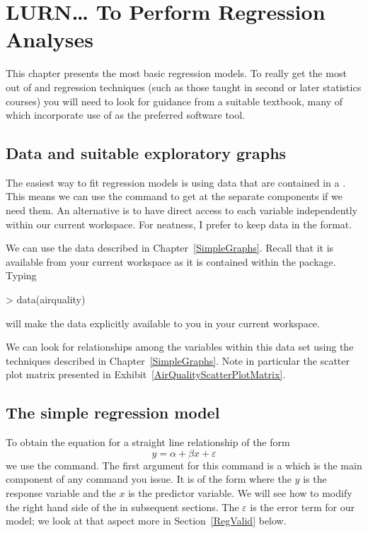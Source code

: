 

\chapter{LURN\ldots{} To Perform Regression Analyses} 
\label{Regression} 
 
 

 
This chapter presents the most basic regression models. To really get the most out of \R{} and regression techniques (such as those taught in second or later statistics courses) you will need to look for guidance from a suitable textbook, many of which incorporate use of \R{} as the preferred software tool. 
 
\section{Data and suitable exploratory graphs} 
 
The easiest way to fit regression models is using data that are contained in a . This means we can use the  command to get at the separate components if we need them. An alternative is to have direct access to each variable independently within our current workspace. For neatness, I prefer to keep data in the  format. 
 
We can use the  data described in Chapter~\ref{SimpleGraphs}. Recall that it is available from your current workspace as it is contained within the  package. Typing 
\begin{Schunk}
\begin{Sinput}
> data(airquality) 
\end{Sinput}
\end{Schunk}
will make the data explicitly available to you in your current \R{} workspace. 
 
We can look for relationships among the variables within this data set using the techniques described in Chapter~\ref{SimpleGraphs}. Note in particular the scatter plot matrix presented in Exhibit~\ref{AirQualityScatterPlotMatrix}. 
 
 
 
\section{The simple regression model} 
 
To obtain the equation for a straight line relationship of the form \begin{equation} 
y=\alpha+\beta{}x +\varepsilon 
\end{equation} we use the  command. The first argument for this command is a  which is the main component of any  command you issue. It is of the form  where the $y$ is the response variable and the $x$ is the predictor variable. We will see how to modify the right hand side of the  in subsequent sections. The $\varepsilon$ is the error term for our model; we look at that aspect more in Section~\ref{RegValid}    below.  

